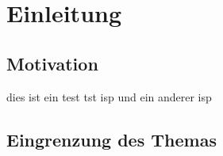 \chapter{Einleitung}

\section{Motivation}
\label{ch:1}

dies ist ein test \gls{tst} \gls{isp} und ein anderer \gls{isp}

\section{Eingrenzung des Themas}
\label{ch:eingrenzungThema}
